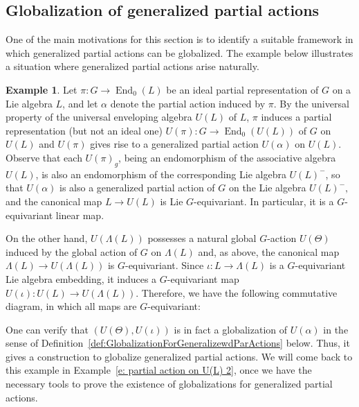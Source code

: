 \documentclass[11pt]{amsart}
\numberwithin{equation}{section}
\theoremstyle{definition}
\newtheorem{example}[theorem]{Example}
\theoremstyle{remark}
\begin{document}
 

\subsection{Globalization of generalized partial actions}

One of the main motivations for this section is to identify a suitable framework in which generalized partial actions can be globalized. The example below illustrates a situation where generalized partial actions arise naturally.
\begin{example}\label{e: partial action on U(L)}
    Let $\pi: G \to \operatorname{End}_0(L)$ be  an ideal partial representation of $G$ on a Lie algebra $L$, and let $\alpha$ denote the partial action induced by $\pi$.
    By the universal property of the universal enveloping algebra $U(L)$ of $L$, $\pi$ induces a partial representation (but not  an ideal one) $U(\pi) : G \to \operatorname{End}_0(U(L))$ of $G$ on $U(L)$ and \(U(\pi)\) gives rise to a generalized partial action $U(\alpha)$ on $U(L)$. 
     Observe that each \(U(\pi)_g\), being an endomorphism of the associative algebra $U(L)$, is also an endomorphism of the corresponding Lie algebra  $U(L)^-$, so that $U(\alpha)$  is also a generalized partial action of $G$ on the Lie algebra  $U(L)^-,$ and the canonical map $L\to U(L)$ is Lie $G$-equivariant.  In particular, it is a 
    $G$-equivariant linear map.
    
    On the other hand, \(U(\Lambda(L))\) possesses a natural global \(G\)-action \(U(\Theta)\) induced by the global action of \(G\) on \(\Lambda(L)\)
     and, as above,  the canonical map 
    \(\Lambda(L) \to U(\Lambda(L)) \) is  \(G\)-equivariant. Since  \( \iota : L \to  \Lambda (L)   \)  is a \(G\)-equivariant  Lie algebra embedding, it induces a \(G\)-equivariant map  \(U(\iota ): U(L) \to  U (\Lambda(L))\).
    Therefore, we have the following commutative diagram, in which all maps are  \(G\)-equivariant:
    \begin{center}
\end{center}
    One can verify that \((U(\Theta), U(\iota))\) is in fact a globalization of \(U(\alpha)\)
    in the sense of Definition~\ref{def:GlobalizationForGeneralizewdParActions} below.
    Thus, it gives a construction to globalize generalized partial actions.
    We  will come back to this example in Example~\ref{e: partial action on U(L) 2}, once we have the necessary tools to prove the existence of globalizations for generalized partial actions.
\end{example}
\end{document}
